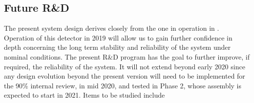 \subsection{Future R\&D}
\label{sec:fdsp-hv-protodune-RD}

The present  system design derives closely from the one in operation in .  Operation of this detector in 2019 will allow us to gain further confidence in depth concerning the long term stability and reliability of the  system under nominal conditions. The present R\&D program has the goal to further improve, if required, the reliability of the system. It will not extend beyond early 2020 since any design evolution beyond the present version will need to be implemented for the 90\% internal review, in mid 2020, and tested in  Phase 2, whose assembly is expected to start in 2021. Items to be studied include
